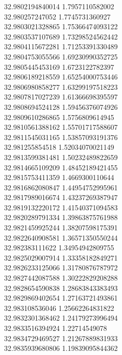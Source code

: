 {32.9802194840014	1.7957110582002\\
32.980257247052	1.7745731360927\\
32.9803021328865	1.75366474093122\\
32.9803537107689	1.73298524562442\\
32.9804115672281	1.71253391330489\\
32.9804753055566	1.69230990352725\\
32.9805445453169	1.6723122782397\\
32.9806189218559	1.65254000753446\\
32.9806980858277	1.63299197518223\\
32.9807817027239	1.61366698395597\\
32.9808694524128	1.59456376074926\\
32.9809610286865	1.5756809614945\\
32.9810561388162	1.55701717588607\\
32.9811545031165	1.53857093191376\\
32.981255854518	1.52034070021149\\
32.9813599381481	1.50232489822659\\
32.9814665109209	1.48452189421455\\
32.9815753411359	1.4669300110644\\
32.9816862080847	1.44954752995961\\
32.9817989016674	1.43237269387947\\
32.9819132220172	1.41540371094583\\
32.9820289791334	1.39863875761988\\
32.9821459925244	1.38207598175391\\
32.9822640908581	1.36571350550244\\
32.982383111622	1.34954942809755\\
32.9825029007914	1.33358182849271\\
32.9826233125066	1.31780876787972\\
32.9827442087588	1.30222829208288\\
32.9828654590838	1.28683843383493\\
32.9829869402654	1.27163721493861\\
32.983108536046	1.25662264831822\\
32.9832301368462	1.24179273996494\\
32.9833516394924	1.22714549078\\
32.9834729469527	1.21267889831933\\
32.9835939680806	1.19839095844362\\
}
